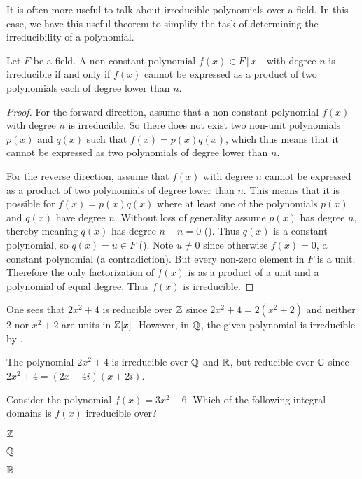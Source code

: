 It is often more useful to talk about irreducible polynomials over a field. In this case, we have this useful theorem to simplify the task of determining the irreducibility of a polynomial.
\begin{theorem}\label{thrm-irreducible-iff-not-expressable-as-product-of-smaller-polynomials}
    Let $F$ be a field. A non-constant polynomial $f(x) \in F[x]$ with degree $n$ is irreducible if and only if $f(x)$ cannot be expressed as a product of two polynomials each of degree lower than $n$.
\end{theorem}
\begin{proof}
    For the forward direction, assume that a non-constant polynomial $f(x)$ with degree $n$ is irreducible. So there does not exist two non-unit polynomials $p(x)$ and $q(x)$ such that $f(x) = p(x)q(x)$, which thus means that it cannot be expressed as two polynomials of degree lower than $n$.

    For the reverse direction, assume that $f(x)$ with degree $n$ cannot be expressed as a product of two polynomials of degree lower than $n$. This means that it is possible for $f(x) = p(x)q(x)$ where at least one of the polynomials $p(x)$ and $q(x)$ have degree $n$. Without loss of generality assume $p(x)$ has degree $n$, thereby meaning $q(x)$ has degree $n - n = 0$ (). Thus $q(x)$ is a constant polynomial, so $q(x) = u \in F$ (). Note $u \neq 0$ since otherwise $f(x) = 0$, a constant polynomial (a contradiction). But every non-zero element in $F$ is a unit. Therefore the only factorization of $f(x)$ is as a product of a unit and a polynomial of equal degree. Thus $f(x)$ is irreducible.
\end{proof}

\begin{example}
    One sees that $2x^2 + 4$ is reducible over $\mathbb{Z}$ since $2x^2 + 4 = 2(x^2 + 2)$ and neither 2 nor $x^2 + 2$ are units in $\mathbb{Z}[x]$. However, in $\mathbb{Q}$, the given polynomial is irreducible by .
\end{example}

\begin{example}
    The polynomial $2x^2 + 4$ is irreducible over $\mathbb{Q}$ and $\mathbb{R}$, but reducible over $\mathbb{C}$ since $2x^2 + 4 = (2x-4i)(x+2i)$.
\end{example}

\begin{exercise}
    Consider the polynomial $f(x) = 3x^2 - 6$. Which of the following integral domains is $f(x)$ irreducible over?
    \begin{partquestions}{\alph*}
        \item $\mathbb{Z}$
        \item $\mathbb{Q}$
        \item $\mathbb{R}$
    \end{partquestions}
\end{exercise}

